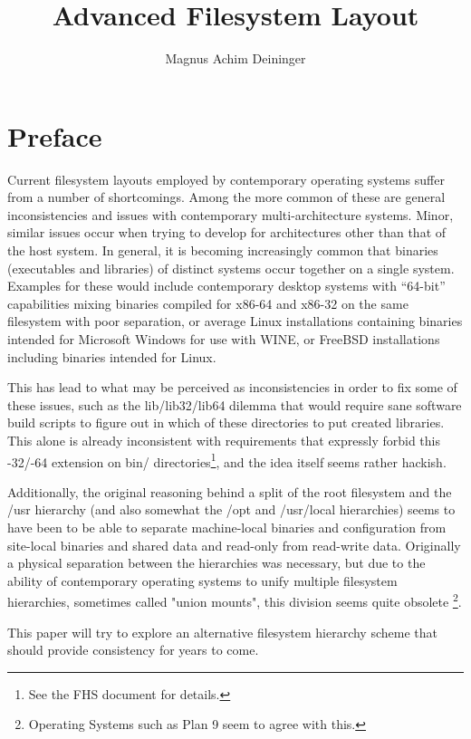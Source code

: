 \documentclass[a4paper,twoside,titlepage]{article}
\title{Advanced Filesystem Layout}
\author{Magnus Achim Deininger}
\begin{document}
\maketitle
\tableofcontents

\newpage

\section*{Preface}
Current filesystem layouts employed by contemporary operating systems suffer
from a number of shortcomings. Among the more common of these are general
inconsistencies and issues with contemporary multi-architecture systems. Minor,
similar issues occur when trying to develop for architectures other than that of
the host system. In general, it is becoming increasingly common that binaries
(executables and libraries) of distinct systems occur together on a single
system. Examples for these would include contemporary desktop systems with
``64-bit'' capabilities mixing binaries compiled for x86-64 and x86-32 on the
same filesystem with poor separation, or average Linux installations containing
binaries intended for Microsoft Windows for use with WINE, or FreeBSD
installations including binaries intended for Linux.

This has lead to what may be perceived as inconsistencies in order to fix some
of these issues, such as the lib/lib32/lib64 dilemma that would require sane
software build scripts to figure out in which of these directories to put
created libraries. This alone is already inconsistent with requirements that
expressly forbid this -32/-64 extension on bin/ directories\footnote{See the FHS
document for details.}, and the idea itself seems rather hackish.

Additionally, the original reasoning behind a split of the root filesystem and
the /usr hierarchy (and also somewhat the /opt and /usr/local hierarchies) seems
to have been to be able to separate machine-local binaries and configuration
from site-local binaries and shared data and read-only from read-write data.
Originally a physical separation between the hierarchies was necessary, but due
to the ability of contemporary operating systems to unify multiple filesystem
hierarchies, sometimes called "union mounts", this division seems quite obsolete
\footnote{Operating Systems such as Plan 9 seem to agree with this.}.

This paper will try to explore an alternative filesystem hierarchy scheme that
should provide consistency for years to come.
\end{document}
